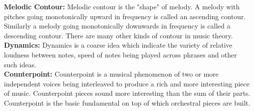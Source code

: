 \noindent \textbf{Melodic Contour:} Melodic contour is the "shape" of melody. A melody with pitches going monotonically upward in frequency is called an ascending contour. Similarly a melody going monotonically downwards in frequency is called a descending contour. There are many other kinds of contour in music theory. \\

\noindent \textbf{Dynamics:} Dynamics is a coarse idea which indicate the variety of relative loudness between notes, speed of notes being played across phrases and other such ideas. \\

\noindent \textbf{Counterpoint: } Counterpoint is a musical phenomenon of two or more independent voices being interleaved to produce a rich and more interesting piece of music. Counterpoint pieces sound more interesting than the sum of their parts. Counterpoint is the basic fundamental on top of which orchestral pieces are built. 